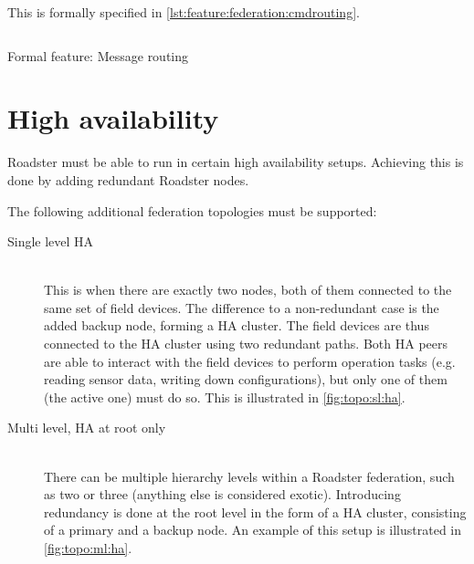 This is formally specified in \autoref{lst:feature:federation:cmdrouting}.

\begin{listing}
	\inputminted{Gherkin}{listings/features/federation/message_routing.feature}
	\caption{Formal feature: Message routing}
	\label{lst:feature:federation:cmdrouting}
\end{listing}

\section{High availability}
Roadster must be able to run in certain high availability setups. Achieving
this is done by adding redundant Roadster nodes.

The following additional federation topologies must be supported:
\begin{description}
	\item [ Single level \gls{HA} ] \hfill\\
		This is when there are exactly two nodes, both of them
		connected to the same set of field devices. The difference to a
		non-redundant case is the added backup node, forming a HA
		cluster. The field devices are thus connected to the HA cluster
		using two redundant paths. Both HA peers are able to interact
		with the field devices to perform operation tasks (e.g. reading
		sensor data, writing down configurations), but only one of them
		(the active one) must do so. This is illustrated in
		\autoref{fig:topo:sl:ha}.

	\item [ Multi level, \gls{HA} at root only ] \hfill\\
		There can be multiple hierarchy levels within a Roadster federation, such as two or
		three (anything else is considered exotic). Introducing
		redundancy is done at the root level in the form of a HA
		cluster, consisting of a primary and a backup node. An example of this setup is illustrated in
		\autoref{fig:topo:ml:ha}.
\end{description}

